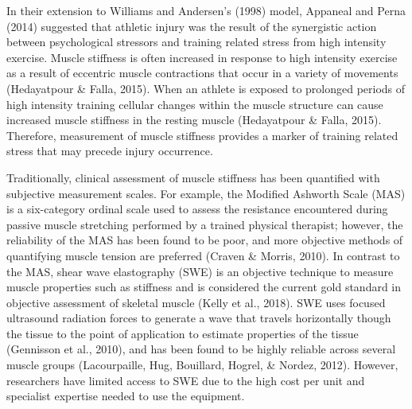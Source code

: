 \documentclass[man,floatsintext]{apa6}
\begin{document}
In their extension to Williams and Andersen's (1998) model, Appaneal and Perna (2014) suggested that athletic injury was the result of the synergistic action between psychological stressors and training related stress from high intensity exercise.
Muscle stiffness is often increased in response to high intensity exercise as a result of eccentric muscle contractions that occur in a variety of movements (Hedayatpour \& Falla, 2015).
When an athlete is exposed to prolonged periods of high intensity training cellular changes within the muscle structure can cause increased muscle stiffness in the resting muscle (Hedayatpour \& Falla, 2015).
Therefore, measurement of muscle stiffness provides a marker of training related stress that may precede injury occurrence.

Traditionally, clinical assessment of muscle stiffness has been quantified with subjective measurement scales.
For example, the Modified Ashworth Scale (MAS) is a six-category ordinal scale used to assess the resistance encountered during passive muscle stretching performed by a trained physical therapist; however, the reliability of the MAS has been found to be poor, and more objective methods of quantifying muscle tension are preferred (Craven \& Morris, 2010).
In contrast to the MAS, shear wave elastography (SWE) is an objective technique to measure muscle properties such as stiffness and is considered the current gold standard in objective assessment of skeletal muscle (Kelly et al., 2018).
SWE uses focused ultrasound radiation forces to generate a wave that travels horizontally though the tissue to the point of application to estimate properties of the tissue (Gennisson et al., 2010),
and has been found to be highly reliable across several muscle groups (Lacourpaille, Hug, Bouillard, Hogrel, \& Nordez, 2012).
However, researchers have limited access to SWE due to the high cost per unit and specialist expertise needed to use the equipment.
\end{document}

